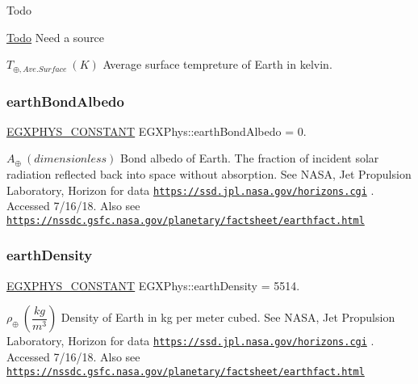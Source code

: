 \begin{DoxyRefDesc}{Todo}
\item[\mbox{\hyperlink{todo__todo000001}{Todo}}]Need a source \end{DoxyRefDesc}
$T_{\oplus,Ave. Surface}\ (K)$ Average surface tempreture of Earth in kelvin. \mbox{\label{group___e_g_x_phys-_constants-_astrophysics-_solar_system-_earth-_bulk_gad71c87a7e90df69eed292f9a54376fff}} 
\subsubsection{\texorpdfstring{earth\+Bond\+Albedo}{earthBondAlbedo}}
{\footnotesize\ttfamily \mbox{\hyperlink{group___e_g_x_phys-_constants-_macros_ga76980d288494ce1714c9ac68a95ba702}{E\+G\+X\+P\+H\+Y\+S\+\_\+\+C\+O\+N\+S\+T\+A\+NT}} E\+G\+X\+Phys\+::earth\+Bond\+Albedo = 0.}

$ A_{\oplus} \ (dimensionless)$ Bond albedo of Earth. The fraction of incident solar radiation reflected back into space without absorption. See N\+A\+SA, Jet Propulsion Laboratory, Horizon for data \href{https://ssd.jpl.nasa.gov/horizons.cgi}{\tt https\+://ssd.\+jpl.\+nasa.\+gov/horizons.\+cgi} . Accessed 7/16/18. Also see \href{https://nssdc.gsfc.nasa.gov/planetary/factsheet/earthfact.html}{\tt https\+://nssdc.\+gsfc.\+nasa.\+gov/planetary/factsheet/earthfact.\+html} \mbox{\label{group___e_g_x_phys-_constants-_astrophysics-_solar_system-_earth-_bulk_ga7ff84de93ff11190d3b84d8ff8525c04}} 
\subsubsection{\texorpdfstring{earth\+Density}{earthDensity}}
{\footnotesize\ttfamily \mbox{\hyperlink{group___e_g_x_phys-_constants-_macros_ga76980d288494ce1714c9ac68a95ba702}{E\+G\+X\+P\+H\+Y\+S\+\_\+\+C\+O\+N\+S\+T\+A\+NT}} E\+G\+X\+Phys\+::earth\+Density = 5514.}

$\rho_{\oplus} \ (\dfrac{kg}{m^3})$ Density of Earth in kg per meter cubed. See N\+A\+SA, Jet Propulsion Laboratory, Horizon for data \href{https://ssd.jpl.nasa.gov/horizons.cgi}{\tt https\+://ssd.\+jpl.\+nasa.\+gov/horizons.\+cgi} . Accessed 7/16/18. Also see \href{https://nssdc.gsfc.nasa.gov/planetary/factsheet/earthfact.html}{\tt https\+://nssdc.\+gsfc.\+nasa.\+gov/planetary/factsheet/earthfact.\+html} \mbox{\label{group___e_g_x_phys-_constants-_astrophysics-_solar_system-_earth-_bulk_gada6c6733f79e984d42cf37210b4ad18f}} 
